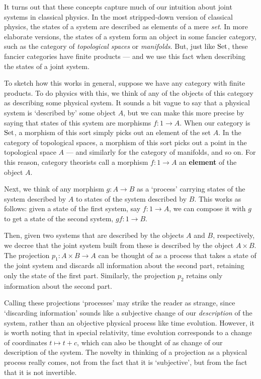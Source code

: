 \documentclass{article}
\newcommand{\Set}{{\rm Set}}
\renewcommand{\to}{\rightarrow}
\newcommand{\maps}{\colon}
\begin{document}
It turns out that these concepts capture much of our intuition about
joint systems in classical physics.  In the most stripped-down version
of classical physics, the states of a system are described as elements
of a mere {\it set}.  In more elaborate versions, the states of a
system form an object in some fancier category, such as the category
of {\it topological spaces} or {\it manifolds}.  But, just like
$\Set$, these fancier categories have finite products --- and we use
this fact when describing the states of a joint system.

To sketch how this works in general, suppose we have any category with
finite products.  To do physics with this, we think of any of the
objects of this category as describing some physical system.  It
sounds a bit vague to say that a physical system is `described by'
some object $A$, but we can make this more precise by saying that
states of this system are morphisms $f \maps 1 \to A$.  When our
category is $\Set$, a morphism of this sort simply picks out an
element of the set $A$.  In the category of topological spaces, a
morphism of this sort picks out a point in the topological space $A$
--- and similarly for the category of manifolds, and so on.  For this
reason, category theorists call a morphism $f \maps 1 \to A$ an {\bf
element} of the object $A$.  

Next, we think of any morphism $g \maps A \to B$ as a `process' carrying 
states of the system described by $A$ to states of the system described 
by $B$.  This works as follows: given a state of the first system, 
say $f \maps 1 \to A$, we can compose it with $g$ to get a state of
the second system, $gf \maps 1 \to B$.

Then, given two systems that are described by the objects $A$ and $B$,
respectively, we decree that the joint system built from these is
described by the object $A \times B$.  The projection $p_1 \maps A
\times B \to A$ can be thought of as a process that takes a state of
the joint system and discards all information about the second part,
retaining only the state of the first part.  Similarly, the projection
$p_2$ retains only information about the second part.  

Calling these projections `processes' may strike the reader as
strange, since `discarding information' sounds like a subjective
change of our {\it description} of the system, rather than an
objective physical process like time evolution.  However, it is worth
noting that in special relativity, time evolution corresponds to a
change of coordinates $t \mapsto t + c$, which can also be thought of
as change of our description of the system.  The novelty in thinking
of a projection as a physical process really comes, not from the fact
that it is `subjective', but from the fact that it is not invertible.
\end{document}
